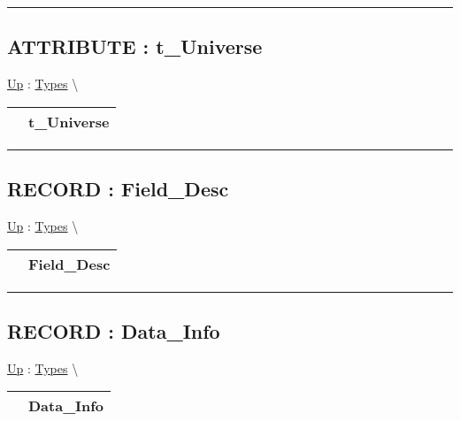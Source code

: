 \rule{\linewidth}{0.5pt}

\subsection*{ATTRIBUTE : t\_Universe}
\hypertarget{ecldoc:logisticregression.types.t_universe}{}
\hyperlink{ecldoc:LogisticRegression.Types}{Up} :
\hspace{0pt} \hyperlink{ecldoc:LogisticRegression.Types}{Types} \textbackslash 

{\renewcommand{\arraystretch}{1.5}
\begin{tabularx}{\textwidth}{|>{\raggedright\arraybackslash}l|X|}
\hline
\hspace{0pt} & t\_Universe \\
\hline
\end{tabularx}
}

\par


\rule{\linewidth}{0.5pt}
\subsection*{RECORD : Field\_Desc}
\hypertarget{ecldoc:logisticregression.types.field_desc}{}
\hyperlink{ecldoc:LogisticRegression.Types}{Up} :
\hspace{0pt} \hyperlink{ecldoc:LogisticRegression.Types}{Types} \textbackslash 

{\renewcommand{\arraystretch}{1.5}
\begin{tabularx}{\textwidth}{|>{\raggedright\arraybackslash}l|X|}
\hline
\hspace{0pt} & Field\_Desc \\
\hline
\end{tabularx}
}

\par


\rule{\linewidth}{0.5pt}
\subsection*{RECORD : Data\_Info}
\hypertarget{ecldoc:logisticregression.types.data_info}{}
\hyperlink{ecldoc:LogisticRegression.Types}{Up} :
\hspace{0pt} \hyperlink{ecldoc:LogisticRegression.Types}{Types} \textbackslash 

{\renewcommand{\arraystretch}{1.5}
\begin{tabularx}{\textwidth}{|>{\raggedright\arraybackslash}l|X|}
\hline
\hspace{0pt} & Data\_Info \\
\hline
\end{tabularx}
}

